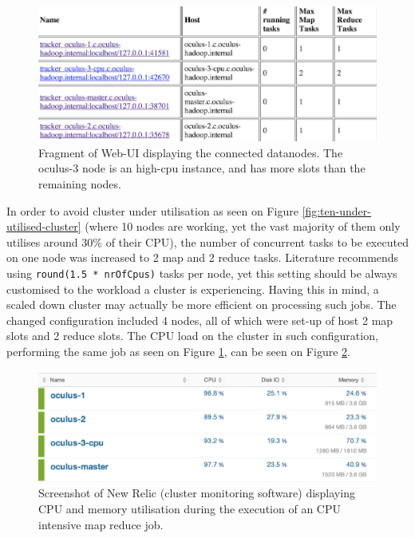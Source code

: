 \begin{figure}[ch!]
  \centering
  \includegraphics[width=\textwidth]{img/hadoop/4node-cluster-config}
  \caption{Fragment of Web-UI displaying the connected datanodes. The oculus-3 node is an high-cpu instance, and has more slots than the remaining nodes.}
  \label{fig:four-nodes-config}
\end{figure}

In order to avoid cluster under utilisation as seen on Figure \ref{fig:ten-under-utilised-cluster} (where 10 nodes are working, yet the vast majority of them only utilises around 30\% of their CPU), the number of concurrent tasks to be executed on one node was increased to 2 map and 2 reduce tasks. Literature recommends using \verb|round(1.5 * nrOfCpus)| tasks per node, yet this setting should be always customised to the workload a cluster is experiencing. Having this in mind, a scaled down cluster may actually be more efficient on processing such jobs. The changed configuration included 4 nodes, all of which were set-up of host 2 map slots and 2 reduce slots. The CPU load on the cluster in such configuration, performing the same job as seen on Figure \ref{fig:four-nodes-config}, can be seen on Figure \ref{fig:cpu-load-during-job}.

\begin{figure}[ch!]
  \centering
  \includegraphics[width=\textwidth]{img/hadoop/monitoring-during-processing}
  \caption{Screenshot of New Relic (cluster monitoring software) displaying CPU and memory utilisation during the execution of an CPU intensive map reduce job.}
  \label{fig:cpu-load-during-job}
\end{figure}


